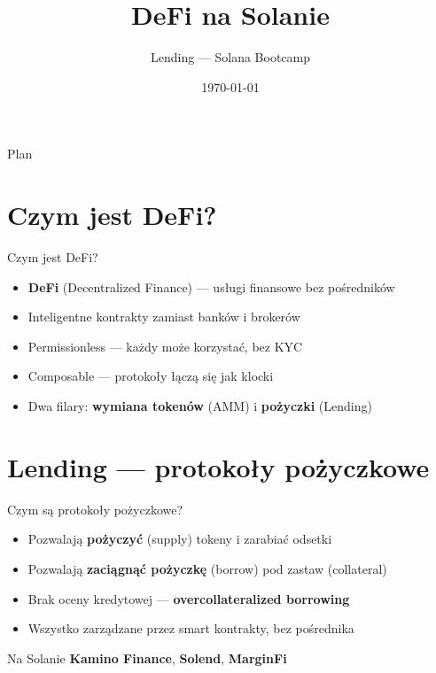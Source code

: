 

\usepackage[utf8]{inputenc}
\usepackage[T1]{fontenc}
\usepackage{amsmath}

\title{DeFi na Solanie}
\subtitle{Lending --- Solana Bootcamp}
\author{}
\date{\today}



\maketitleframe

\begin{frame}{Plan}
  \tableofcontents
\end{frame}

\section{Czym jest DeFi?}

\begin{frame}{Czym jest DeFi?}
  \begin{itemize}
    \item \textbf{DeFi} (Decentralized Finance) --- usługi finansowe bez pośredników
    \item Inteligentne kontrakty zamiast banków i brokerów
    \item Permissionless --- każdy może korzystać, bez KYC
    \item Composable --- protokoły łączą się jak klocki
    \item Dwa filary: \textbf{wymiana tokenów} (AMM) i \textbf{pożyczki} (Lending)
  \end{itemize}
\end{frame}

\section{Lending --- protokoły pożyczkowe}

\begin{frame}{Czym są protokoły pożyczkowe?}
  \begin{itemize}
    \item Pozwalają \textbf{pożyczyć} (supply) tokeny i zarabiać odsetki
    \item Pozwalają \textbf{zaciągnąć pożyczkę} (borrow) pod zastaw (collateral)
    \item Brak oceny kredytowej --- \textbf{overcollateralized borrowing}
    \item Wszystko zarządzane przez smart kontrakty, bez pośrednika
  \end{itemize}
  \vspace{0.3cm}
  \begin{exampleblock}{Na Solanie}
    \textbf{Kamino Finance}, \textbf{Solend}, \textbf{MarginFi}
  \end{exampleblock}
\end{frame}

